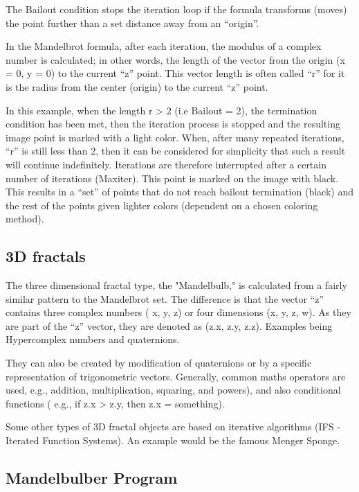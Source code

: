 The Bailout condition stops the iteration loop if the formula transforms
(moves) the point further than a set distance away from an ``origin''.

In the Mandelbrot formula, after each iteration, the modulus of a
complex number is calculated; in other words, the length of the vector
from the origin (x = 0, y = 0) to the current ``z'' point. This vector
length is often called ``r'' for it is the radius from the center
(origin) to the current ``z'' point.

In this example, when the length r \textgreater{} 2 (i.e Bailout = 2),
the termination condition has been met, then the iteration process is
stopped and the resulting image point is marked with a light color.
When, after many repeated iterations, ``r'' is still less than 2, then
it can be considered for simplicity that such a result will continue
indefinitely. Iterations are therefore interrupted after a certain
number of iterations (Maxiter). This point is marked on the image with
black. This results in a ``set'' of points that do not reach bailout
termination (black) and the rest of the points given lighter colors
(dependent on a chosen coloring method).

\subsection{3D fractals}\label{d-fractals}

The three dimensional fractal type, the "Mandelbulb," is calculated from
a fairly similar pattern to the Mandelbrot set. The difference is that
the vector ``z'' contains three complex numbers ( x, y, z) or four
dimensions (x, y, z, w). As they are part of the ``z'' vector, they are
denoted as (z.x, z.y, z.z). Examples being Hypercomplex numbers and
quaternions.

They can also be created by modification of quaternions or by a specific
representation of trigonometric vectors. Generally, common maths
operators are used, e.g., addition, multiplication, squaring, and
powers), and also conditional functions ( e.g., if z.x \textgreater{}
z.y, then z.x = something).

Some other types of 3D fractal objects are based on iterative algorithms
(IFS - Iterated Function Systems). An example would be the famous Menger
Sponge.

\subsection{Mandelbulber Program}\label{mandelbulber-program}

